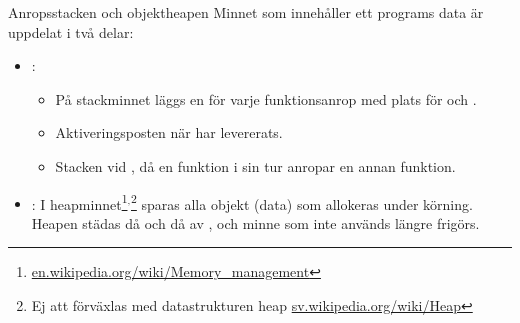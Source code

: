 
\begin{Slide}{Anropsstacken och objektheapen}\SlideFontSmall
Minnet som innehåller ett programs data är uppdelat i två delar:
\begin{itemize}
\item {}: 
\begin{itemize}\SlideFontSmall
\item På stackminnet läggs en   för varje funktionsanrop med plats för  och .
\item Aktiveringsposten  när  har levererats.
\item Stacken  vid , då en funktion i sin tur anropar en annan funktion.
\end{itemize}
\item {}: I heapminnet\footnote{\href{https://en.wikipedia.org/wiki/Memory_management}{en.wikipedia.org/wiki/Memory\_management}}$^{,}$\footnote{Ej att förväxlas med datastrukturen heap  \href{https://sv.wikipedia.org/wiki/Heap}{sv.wikipedia.org/wiki/Heap}} sparas alla objekt (data) som allokeras under körning. Heapen städas då och då av  , och minne som inte används längre frigörs. \\\vspace{0.5em}
\end{itemize}
\end{Slide}

